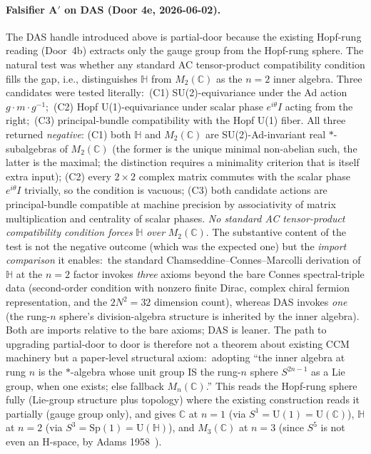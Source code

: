 \documentclass[11pt]{article}
\begin{document}
\paragraph{Falsifier A$'$ on DAS (Door 4e, 2026-06-02).}
The DAS handle introduced above is partial-door because the existing
Hopf-rung reading (Door~4b) extracts only the gauge
group from the Hopf-rung sphere. The natural test was whether any
standard AC tensor-product compatibility condition fills the gap, i.e.,
distinguishes $\mathbb{H}$ from $M_2(\mathbb{C})$ as the $n=2$ inner
algebra. Three candidates were tested literally:\ (C1)
SU(2)-equivariance under the Ad action $g \cdot m \cdot g^{-1}$;\
(C2) Hopf U(1)-equivariance under scalar phase $e^{i\theta}I$ acting
from the right;\ (C3) principal-bundle compatibility with the Hopf U(1)
fiber. All three returned \emph{negative}: (C1) both $\mathbb{H}$ and
$M_2(\mathbb{C})$ are SU(2)-Ad-invariant real $*$-subalgebras of
$M_2(\mathbb{C})$ (the former is the unique minimal non-abelian such,
the latter is the maximal; the distinction requires a minimality
criterion that is itself extra input); (C2) every $2 \times 2$ complex
matrix commutes with the scalar phase $e^{i\theta}I$ trivially, so the
condition is vacuous; (C3) both candidate actions are
principal-bundle compatible at machine precision by associativity of
matrix multiplication and centrality of scalar phases. \emph{No standard
AC tensor-product compatibility condition forces} $\mathbb{H}$
\emph{over} $M_2(\mathbb{C})$. The substantive content of the test is
not the negative outcome (which was the expected one) but the
\emph{import comparison} it enables:\ the standard
Chamseddine--Connes--Marcolli derivation of $\mathbb{H}$ at the $n=2$
factor invokes \emph{three} axioms beyond the bare Connes spectral-triple
data (second-order condition with nonzero finite Dirac, complex chiral
fermion representation, and the $2N^2 = 32$ dimension count), whereas
DAS invokes \emph{one} (the rung-$n$ sphere's division-algebra
structure is inherited by the inner algebra). Both are imports relative
to the bare axioms; DAS is leaner. The path to upgrading partial-door
to door is therefore not a theorem about existing CCM machinery but a
paper-level structural axiom:\ adopting ``the inner algebra at rung $n$
is the $*$-algebra whose unit group IS the rung-$n$ sphere $S^{2n-1}$ as
a Lie group, when one exists; else fallback $M_n(\mathbb{C})$.'' This
reads the Hopf-rung sphere fully (Lie-group structure plus topology)
where the existing construction reads it partially (gauge group only),
and gives $\mathbb{C}$ at $n=1$ (via $S^1 = \mathrm{U}(1) =
\mathrm{U}(\mathbb{C})$), $\mathbb{H}$ at $n=2$ (via $S^3 =
\mathrm{Sp}(1) = \mathrm{U}(\mathbb{H})$), and $M_3(\mathbb{C})$ at
$n=3$ (since $S^5$ is not even an H-space, by Adams 1958~\cite{adams1958}).
\end{document}
